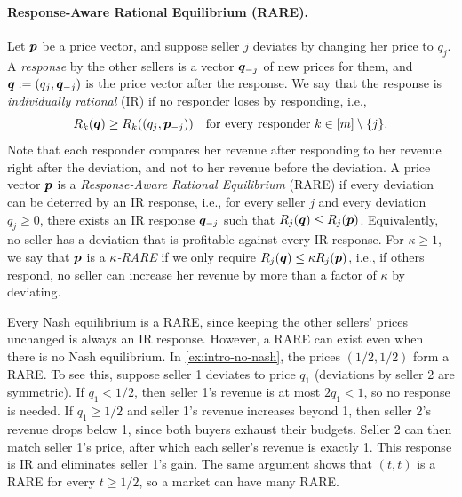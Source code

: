 \paragraph{Response-Aware Rational Equilibrium (RARE).}
Let $\bm{p}$ be a price vector, and suppose seller $j$ deviates by changing her price to $q_j$.
A \emph{response} by the other sellers is a vector $\bm{q}_{-j}$ of new prices for them,
and $\bm{q} := (q_j, \bm{q}_{-j})$ is the price vector after the response.
We say that the response is \emph{individually rational} (IR) if no responder loses by responding, i.e.,
\[ R_k(\bm{q}) \ge R_k((q_j, \bm{p}_{-j})) \quad \text{for every responder } k \in [m] \setminus \{j\}. \]
Note that each responder compares her revenue after responding
to her revenue right after the deviation, and not to her revenue before the deviation.
A price vector $\bm{p}$ is a \emph{Response-Aware Rational Equilibrium} (RARE) if
every deviation can be deterred by an IR response, i.e.,
for every seller $j$ and every deviation $q_j \ge 0$,
there exists an IR response $\bm{q}_{-j}$ such that $R_j(\bm{q}) \le R_j(\bm{p})$.
Equivalently, no seller has a deviation that is profitable against every IR response.
For $\kappa \ge 1$, we say that $\bm{p}$ is a \emph{$\kappa$-RARE} if
we only require $R_j(\bm{q}) \le \kappa R_j(\bm{p})$,
i.e., if others respond, no seller can increase her revenue
by more than a factor of $\kappa$ by deviating.

Every Nash equilibrium is a RARE,
since keeping the other sellers' prices unchanged is always an IR response.
However, a RARE can exist even when there is no Nash equilibrium.
In \cref{ex:intro-no-nash}, the prices $(1/2, 1/2)$ form a RARE.
To see this, suppose seller 1 deviates to price $q_1$ (deviations by seller 2 are symmetric).
If $q_1 < 1/2$, then seller 1's revenue is at most $2q_1 < 1$, so no response is needed.
If $q_1 \ge 1/2$ and seller 1's revenue increases beyond 1,
then seller 2's revenue drops below 1, since both buyers exhaust their budgets.
Seller 2 can then match seller 1's price, after which each seller's revenue is exactly 1.
This response is IR and eliminates seller 1's gain.
The same argument shows that $(t, t)$ is a RARE for every $t \ge 1/2$,
so a market can have many RARE.

